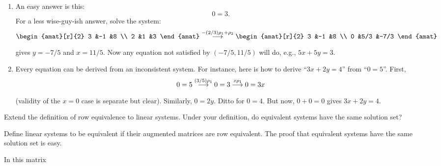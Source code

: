 \begin{exercises}
   \begin{answer}
     \begin{enumerate}
        \item An easy answer is this:
          \begin{equation*}
            0=3.
          \end{equation*}
          For a less wise-guy-ish answer, solve the system:
          \begin{equation*}
            \begin{amat}[r]{2}
              3  &-1  &8  \\
              2  &1   &3
            \end{amat}
            \grstep{-(2/3)\rho_1+\rho_2}
            \begin{amat}[r]{2}
              3  &-1  &8    \\
              0  &5/3 &-7/3
            \end{amat}
          \end{equation*}
          gives \( y=-7/5 \) and \( x=11/5 \).
          Now any equation not satisfied by \( (-7/5,11/5) \) will do,
          e.g., \( 5x+5y=3 \).
        \item Every equation can be derived from an inconsistent system.
          For instance, here is how to derive ``\( 3x+2y=4 \)'' from
          ``\( 0=5 \)''.
          First,
          \begin{equation*}
            0=5
            \mathrel{ \mathop{\longrightarrow}\limits^{(3/5)\rho_1\mathstrut}_{ \begin{subarray}{l} \relax \end{subarray}}}
            0=3
            \mathrel{ \mathop{\longrightarrow}\limits^{x\rho_1\mathstrut}_{ \begin{subarray}{l} \relax \end{subarray}}}
            0=3x
          \end{equation*}
          (validity of the \( x=0 \) case is separate but clear).
          Similarly, \( 0=2y \).
          Ditto for \( 0=4 \).
          But now, \( 0+0=0 \) gives \( 3x+2y=4 \).
     \end{enumerate}  
    \end{answer}
  \item 
    \cite{HoffmanKunze}
    Extend the definition of row equivalence to linear systems.
    Under your definition, do equivalent systems have the same solution set?
    \begin{answer}
      Define linear systems to be equivalent if their augmented
      matrices are row equivalent.
      The proof that equivalent systems have the same solution set is easy.  
    \end{answer}
  \recommended \item 
    In this matrix
    \begin{equation*}

\end{equation*}
\end{exercises}
